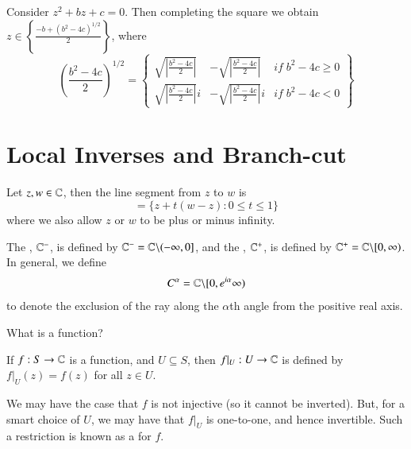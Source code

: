 \documentclass[12pt, a4paper, oneside, openright, titlepage]{book}
\begin{document}
\begin{eg}
    Consider $z^2+bz+c = 0$. Then completing the square we obtain $z \in \left\{\frac{-b+ (b^2-4c)^{1/2}}{2}\right\}$, where \begin{equation*}
        \left(\frac{b^2-4c}{2}\right)^{1/2} = \left\{\begin{array}{ccc} \sqrt{\left|\frac{b^2-4c}{2}\right|} & -\sqrt{\left|\frac{b^2-4c}{2}\right|} & if\;b^2-4c \geq 0 \\ \sqrt{\left|\frac{b^2-4c}{2}\right|}i & -\sqrt{\left|\frac{b^2-4c}{2}\right|}i & if\; b^2-4c < 0 \end{array}\right\}
    \end{equation*}
\end{eg}


\section{Local Inverses and Branch-cut}

\begin{defn}    
    Let $z,w \in \mathbb C$, then the line segment from $z$ to $w$ is \begin{equation*}
        [z,w] = \{z+t(w-z):0\leq t \leq 1\}
    \end{equation*}
    where we also allow $z$ or $w$ to be plus or minus infinity.
\end{defn}

\begin{defn}
    The , $\mathbb C^-$, is defined by $\mathbb C^- = \mathbb C\backslash(-\infty,0]$, and the , $\mathbb C^+$, is defined by $\mathbb C^+ = \mathbb C\backslash[0,\infty)$. In general, we define \begin{equation*}
        C^{\alpha} = \mathbb C\backslash[0,e^{i\alpha}\infty)
    \end{equation*}
    to denote the exclusion of the ray along the $\alpha$th angle from the positive real axis.
\end{defn}

\begin{qst}
    What is a function?
\end{qst}

\begin{defn}
    If $f:S\rightarrow \mathbb C$ is a function, and $U \subseteq S$, then $f\vert_U:U\rightarrow \mathbb C$ is defined by $f\vert_U(z) = f(z)$ for all $z \in U$.
\end{defn}

We may have the case that $f$ is not injective (so it cannot be inverted). But, for a smart choice of $U$, we may have that $f\vert_U$ is one-to-one, and hence invertible. Such a restriction is known as a  for $f$.
\end{document}

